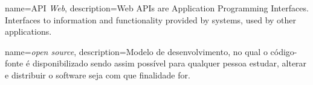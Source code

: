 \label{terminologia}

{
	name={API \textit{Web}},
	description={Web APIs are Application Programming Interfaces. Interfaces to information and functionality provided by systems, used by other applications.}
}

{
	name={\textit{open source}},
	description={Modelo de desenvolvimento, no qual o código-fonte é disponibilizado sendo assim possível para qualquer pessoa estudar, alterar e distribuir o software seja com que finalidade for.}
}